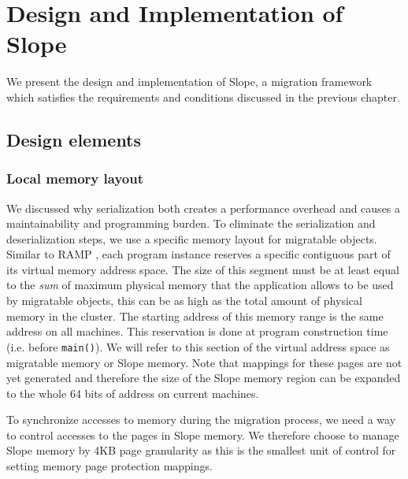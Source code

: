 \chapter{Design and Implementation of Slope}
\label{chap:design}


We present the design and implementation of Slope, a migration framework which
satisfies the requirements and conditions discussed in the previous chapter.

\section{Design elements}

\subsection{Local memory layout}
\label{sec:localmem}
We discussed why serialization both creates a performance overhead and causes
a maintainability and programming burden. To eliminate the serialization and
deserialization steps, we use a specific memory layout for migratable objects.
Similar to RAMP \cite{memon2018ramp}, each program instance reserves a
specific contiguous part of its virtual memory address space. The size of this
segment must be at least equal to the \emph{sum} of maximum physical memory that the
application allows to be used by migratable objects, this can be
as high as the total amount of physical memory in the cluster.
The starting address of this memory range is the same address on all machines.
This reservation is done at program construction time
(i.e. before \texttt{main()}). We will refer to this section of the virtual
address space as migratable memory or Slope memory. Note that mappings for
these pages are not yet generated and therefore the size of the Slope memory
region can be expanded to the whole 64 bits of address on current machines.

To synchronize accesses to memory during the migration process, we need a way
to control accesses to the pages in Slope memory. We therefore choose to manage
Slope memory by 4KB page granularity as this is the smallest unit of control
for setting memory page protection mappings.

